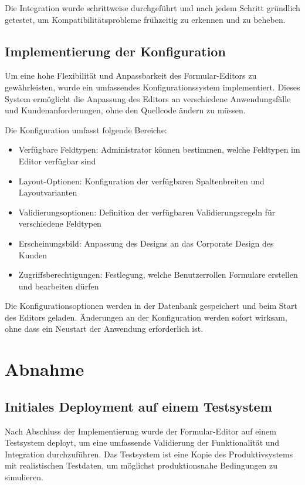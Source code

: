 \documentclass[a4paper,11pt]{article}
\begin{document}
Die Integration wurde schrittweise durchgeführt und nach jedem Schritt gründlich getestet, um Kompatibilitätsprobleme frühzeitig zu erkennen und zu beheben.

\subsection{Implementierung der Konfiguration}
Um eine hohe Flexibilität und Anpassbarkeit des Formular-Editors zu gewährleisten, wurde ein umfassendes Konfigurationssystem implementiert. Dieses System ermöglicht die Anpassung des Editors an verschiedene Anwendungsfälle und Kundenanforderungen, ohne den Quellcode ändern zu müssen.

Die Konfiguration umfasst folgende Bereiche:
\begin{itemize}
  \item Verfügbare Feldtypen: Administrator können bestimmen, welche Feldtypen im Editor verfügbar sind
  \item Layout-Optionen: Konfiguration der verfügbaren Spaltenbreiten und Layoutvarianten
  \item Validierungsoptionen: Definition der verfügbaren Validierungsregeln für verschiedene Feldtypen
  \item Erscheinungsbild: Anpassung des Designs an das Corporate Design des Kunden
  \item Zugriffsberechtigungen: Festlegung, welche Benutzerrollen Formulare erstellen und bearbeiten dürfen
\end{itemize}

Die Konfigurationsoptionen werden in der Datenbank gespeichert und beim Start des Editors geladen. Änderungen an der Konfiguration werden sofort wirksam, ohne dass ein Neustart der Anwendung erforderlich ist.

\section{Abnahme}
\subsection{Initiales Deployment auf einem Testsystem}
Nach Abschluss der Implementierung wurde der Formular-Editor auf einem Testsystem deployt, um eine umfassende Validierung der Funktionalität und Integration durchzuführen. Das Testsystem ist eine Kopie des Produktivsystems mit realistischen Testdaten, um möglichst produktionsnahe Bedingungen zu simulieren.
\end{document}
